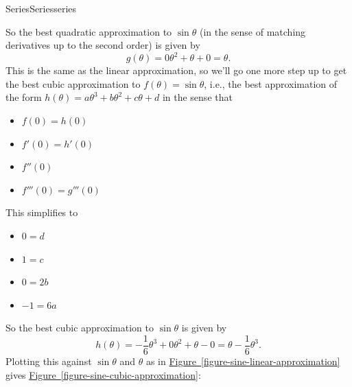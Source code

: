 \documentclass[oneside,10pt,]{book}
\numberwithin{equation}{section}
\begin{document}
\begin{chapterptx}{Series}{}{Series}{}{}{series}
\begin{introduction}{}
\hypertarget{p-782}{}%
So the best quadratic approximation to \(\sin\theta\) (in the sense of matching derivatives up to the second order) is given by%
\begin{equation*}
g(\theta) = 0\theta^{2} + \theta + 0 = \theta.
\end{equation*}
This is the same as the linear approximation, so we'll go one more step up to get the best cubic approximation to \(f(\theta) = \sin\theta\), i.e.\@, the best approximation of the form \(h(\theta) = a\theta^{3} + b\theta^{2} + c\theta + d\) in the sense that%
\leavevmode%
\begin{itemize}[label=\textbullet]
\item{}\(f(0) = h(0)\)%
\item{}\(f'(0) = h'(0)\)%
\item{}\(f''(0)\)%
\item{}\(f'''(0) = g'''(0)\)%
\end{itemize}
\hypertarget{p-783}{}%
This simplifies to%
\leavevmode%
\begin{itemize}[label=\textbullet]
\item{}\(0 = d\)%
\item{}\(1 = c\)%
\item{}\(0 = 2b\)%
\item{}\(-1 = 6a\)%
\end{itemize}
\hypertarget{p-784}{}%
So the best cubic approximation to \(\sin\theta\) is given by%
\begin{equation*}
h(\theta) = -\frac{1}{6}\theta^{3} + 0\theta^{2} + \theta - 0 = \theta  -\frac{1}{6}\theta^{3}.
\end{equation*}
Plotting this against \(\sin \theta\) and \(\theta\) as in \hyperref[figure-sine-linear-approximation]{Figure~\ref{figure-sine-linear-approximation}} gives \hyperref[figure-sine-cubic-approximation]{Figure~\ref{figure-sine-cubic-approximation}}:%
\begin{figure}
\centering
{
}
\end{figure}
\end{introduction}
\end{chapterptx}
\end{document}
